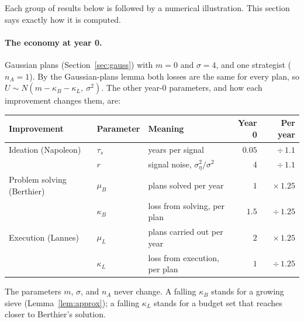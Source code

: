 \documentclass[11pt]{article}
\newcommand{\Nap}{\textcolor{nap}{Napoleon}}
\newcommand{\Ber}{\textcolor{ber}{Berthier}}
\newcommand{\Lan}{\textcolor{lan}{Lannes}}
\theoremstyle{remark}
\begin{document}
Each group of results below is followed by a numerical illustration. This section says exactly how it is computed.

\paragraph{The economy at year 0.} Gaussian plans (Section~\ref{sec:gauss}) with $m=0$ and $\sigma=4$, and one strategist ($n_A=1$). By the Gaussian-plans lemma both losses are the same for every plan, so $U\sim N(m-\kappa_B-\kappa_L,\ \sigma^2)$. The other year-0 parameters, and how each improvement changes them, are:
\begin{center}
\renewcommand{\arraystretch}{1.12}
\begin{tabular}{@{}l l l r r@{}}
\toprule
Improvement & Parameter & Meaning & Year 0 & Per year\\
\midrule
\textcolor{nap}{Ideation} (\Nap) & $\tau_s$ & years per signal & $0.05$ & $\div\,1.1$\\
& $r$ & signal noise, $\sigma_\eta^2/\sigma^2$ & $4$ & $\div\,1.1$\\
\textcolor{ber}{Problem solving} (\Ber) & $\mu_B$ & plans solved per year & $1$ & $\times\,1.25$\\
& $\kappa_B$ & loss from solving, per plan & $1.5$ & $\div\,1.25$\\
\textcolor{lan}{Execution} (\Lan) & $\mu_L$ & plans carried out per year & $2$ & $\times\,1.25$\\
& $\kappa_L$ & loss from execution, per plan & $1$ & $\div\,1.25$\\
\bottomrule
\end{tabular}
\end{center}
The parameters $m$, $\sigma$, and $n_A$ never change. A falling $\kappa_B$ stands for a growing sieve (Lemma~\ref{lem:approx}); a falling $\kappa_L$ stands for a budget set that reaches closer to \Ber's solution.
\end{document}
